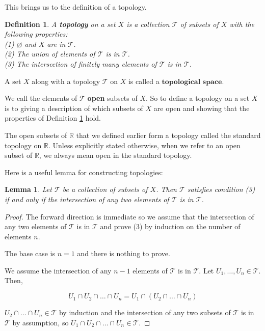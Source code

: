 \documentclass[a4paper]{article}
\newtheorem{lemma}[theorem]{Lemma}
\newtheorem{definition}[theorem]{Definition}
\numberwithin{theorem}{section}
\begin{document}
This brings us to the definition of a topology.

\begin{definition} \label{top}
A \textbf{topology} on a set $X$ is a collection $\mathcal{T}$ of subsets of $X$ with the following properties:\\
(1) $\varnothing$ and $X$ are in $\mathcal{T}$.\\
(2) The union of elements of $\mathcal{T}$ is in $\mathcal{T}$.\\
(3) The intersection of finitely many elements of $\mathcal{T}$ is in $\mathcal{T}$.
\end{definition}
A set $X$ along with a topology $\mathcal{T}$ on $X$ is called a $\textbf{topological space}$.


We call the elements of $\mathcal{T}$ \textbf{open} subsets of $X$. So to define a topology on a set $X$ is to giving a description of which subsets of $X$ are open and showing that the properties of Definition \ref{top} hold.

The open subsets of $\mathbb{R}$ that we defined earlier form a topology called the standard topology on $\mathbb{R}$. Unless explicitly stated otherwise, when we refer to an open subset of $\mathbb{R}$, we always mean open in the standard topology.

Here is a useful lemma for constructing topologies:

\begin{lemma} \label{two}
Let $\mathcal{T}$ be a collection of subsets of $X$. Then $\mathcal{T}$ satisfies condition (3) if and only if the intersection of any two elements of $\mathcal{T}$ is in $\mathcal{T}$.
\end{lemma}

\begin{proof}
The forward direction is immediate so we assume that the intersection of any two elements of $\mathcal{T}$ is in $\mathcal{T}$ and prove (3) by induction on the number of elements $n$.

The base case is $n=1$ and there is nothing to prove.

We assume the intersection of any $n-1$ elements of $\mathcal{T}$ is in $\mathcal{T}$. Let $U_1, \ldots, U_n \in \mathcal{T}$. Then,

$$ U_1 \cap U_2 \cap \dots \cap U_n = U_1 \cap (U_2 \cap \dots \cap U_n) $$

$U_2 \cap \dots \cap U_n \in \mathcal{T}$ by induction and the intersection of any two subsets of $\mathcal{T}$ is in $\mathcal{T}$ by assumption, so $U_1 \cap U_2 \cap \dots \cap U_n \in \mathcal{T}$.

\end{proof}
\end{document}
